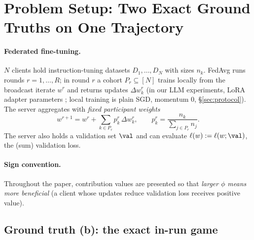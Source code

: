 \section{Problem Setup: Two Exact Ground Truths on One Trajectory}
\label{sec:setup}

\paragraph{Federated fine-tuning.}
$N$ clients hold instruction-tuning datasets $D_1,\dots,D_N$ with sizes $n_k$.
FedAvg \citep{mcmahan2017fedavg} runs rounds $r=1,\dots,R$; in round $r$ a cohort
$P_r \subseteq [N]$ trains locally from the broadcast iterate $w^r$ and returns
updates $\Delta w_k^r$ (in our LLM experiments, LoRA adapter parameters
\citep{hu2022lora}; local training is plain SGD, momentum $0$,
\S\ref{sec:protocol}). The server aggregates with \emph{fixed participant
weights}
\begin{equation}
w^{r+1} = w^r + \sum_{k \in P_r} p_k^r\, \Delta w_k^r,
\qquad p_k^r = \frac{n_k}{\sum_{j \in P_r} n_j}.
\label{eq:fedavg}
\end{equation}
The server also holds a validation set $\val$ and can evaluate
$\ell(w) := \ell(w;\val)$, the (sum) validation loss.

\paragraph{Sign convention.}
Throughout the paper, contribution values are presented so that
\emph{larger $\phi$ means more beneficial} (a client whose updates reduce
validation loss receives positive value). 

\subsection{Ground truth (b): the exact in-run game}
\label{sec:oracle-b}

